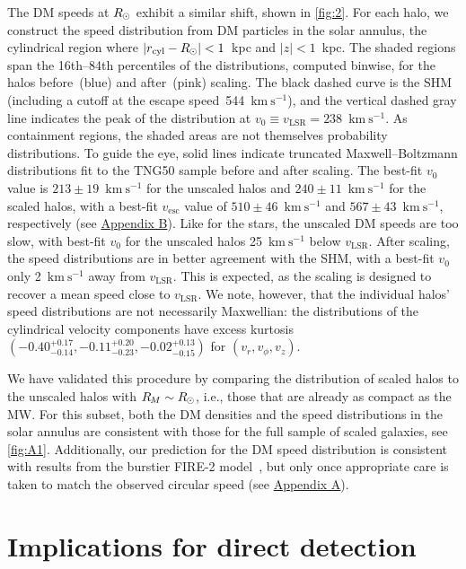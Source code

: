\documentclass[aps,prl,reprint,superscriptaddress,nopreprintnumbers,nobibnotes,floatfix,longbibliography,footinbib]{revtex4-2}
\newcommand{\TNGfifty}{TNG50}
\newcommand{\vLSR}{\ensuremath{v_\mathrm{\scriptscriptstyle LSR}}}
\newcommand{\vesc}{\ensuremath{v_\mathrm{esc}}}
\newcommand{\kms}{\ensuremath{\text{km}~\mathrm{s}^{-1}}}
\newcommand{\Rsun}{\ensuremath{R_{\kern-0.1ex\odot}}}
\newcommand{\Rm}{\ensuremath{R_{\kern-0.2ex M}}}
\begin{document}
The DM speeds at $\Rsun$ exhibit a similar shift, shown in \autoref{fig:2}. For each halo, we construct the speed distribution from DM particles in the solar annulus, the cylindrical region where $|r_\mathrm{cyl}-\Rsun | < 1$~kpc and $|z|<1$~kpc. The shaded regions span the 16th--84th percentiles of the distributions, computed binwise, for the halos before~(blue) and after~(pink) scaling. The black dashed curve is the SHM (including a cutoff at the escape speed~544~\kms{}), and the vertical dashed gray line indicates the peak of the distribution at $v_0\equiv\vLSR = 238$~\kms{}. As containment regions, the shaded areas are not themselves probability distributions. To guide the eye, solid lines indicate truncated Maxwell--Boltzmann distributions fit to the \TNGfifty{} sample before and after scaling. The best-fit $v_0$ value is $213\pm 19$~\kms{} for the unscaled halos and $240\pm11$~\kms{} for the scaled halos, with a best-fit $\vesc{}$ value of $510 \pm 46$~\kms{} and $567\pm 43$~\kms{}, respectively (see \hyperref[app:B]{Appendix B}). Like for the stars, the unscaled DM speeds are too slow, with best-fit $v_0$ for the unscaled halos 25~\kms{} below \vLSR{}. After scaling, the speed distributions are in better agreement with the SHM, with a best-fit $v_0$ only 2~\kms{} away from \vLSR{}. This is expected, as the scaling is designed to recover a mean speed close to $\vLSR$. We note, however, that the individual halos' speed distributions are not necessarily Maxwellian: the distributions of the cylindrical velocity components have excess kurtosis $(-0.40^{+0.17}_{-0.14}, -0.11^{+0.20}_{-0.23}, -0.02^{+0.13}_{-0.15})$ for $(v_r,v_\phi,v_z)$. 


We have validated this procedure by comparing the distribution of scaled halos to the unscaled halos with $\Rm\sim \Rsun$, i.e., those that are already as compact as the MW. For this subset, both the DM densities and the speed distributions in the solar annulus are consistent with those for the full sample of scaled galaxies, see \autoref{fig:A1}. Additionally, our prediction for the DM speed distribution is consistent with results from the burstier FIRE-2 model~\cite{Hopkins18}, but only once appropriate care is taken to match the observed circular speed (see \hyperref[app:A]{Appendix A}).

\section{Implications for direct detection}
\label{sec:4}
\end{document}
